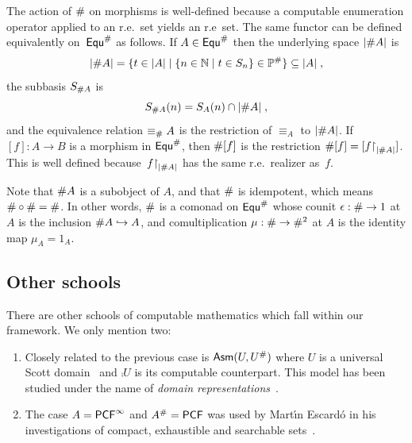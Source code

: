 The action of $\#$ on morphisms is well-defined because a
computable enumeration operator applied to an r.e.~set yields an
r.e~set. The same functor can be defined equivalently on~$\mathsf{Equ}^{\#}$ as
follows. If $A \in \mathsf{Equ}^{\#}$ then the underlying space $|\# A|$ is
%
\begin{equation*}
  |\# A| = \{t \in |A|
    \mid \{n \in \mathbb{N} \mid t \in S_n\} \in \mathbb{P}^{\#}\}
    \subseteq |A| \;,
\end{equation*}
%
the subbasis $S_{\# A}$ is
%
\begin{equation*}
  S_{\# A}(n) = S_A(n) \cap |\# A| \;,
\end{equation*}
%
and the equivalence relation $\equiv_\# A$ is the restriction of
$\equiv_A$ to $|\# A|$. If $[f]: A \to B$ is a morphism in
$\mathsf{Equ}^{\#}$, then $\# [f]$ is the restriction $\# [f] =
 [f{\restriction}_{|\# A|}]$. This is well defined
because~$f{\restriction}_{|\# A|}$ has the same r.e.~realizer as~$f$.

Note that $\# A$ is a subobject of $A$, and that $\#$ is
idempotent, which means $\# \circ \# = \#$. In other
words, $\#$ is
%
%
%
a comonad on $\mathsf{Equ}^{\#}$ whose counit $\epsilon: \# \to 1$
at $A$ is the inclusion $\# A \hookrightarrow A$, and comultiplication
$\mu: \# \to \#^2$ at $A$ is the identity map $\mu_A =
1_A$.



\subsection{Other schools}
\label{sec:other-schools}

There are other schools of computable mathematics which fall within
our framework. We only mention two:
%
\begin{enumerate}
\item
  Closely related to the previous case is $\mathsf{Asm}(U, U^{\#})$ where
  $U$ is a universal Scott domain~\cite{GunterScott} and $\comp{U}$ is
  its computable counterpart. This model has been studied under the
  name of \emph{domain representations}~\cite{Bla97,Bla97a}.
\item
  The case $A = \mathsf{PCF}^\infty$ and $A^{\#} = \mathsf{PCF}$ was used by
  Mart{\'\i}n Escard\'o in his investigations of compact, exhaustible
  and searchable sets~\cite{Escardo}.
\end{enumerate}






